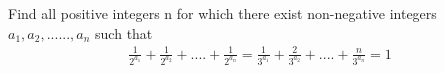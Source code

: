 \item Find all positive integers n for which there exist non-negative integers $a_1, a_2,......,a_n$ such that
\begin{align*}
\frac{1}{2^{a_1}} + \frac{1}{2^{a_2}}+....+\frac{1}{2^{a_n}}
= \frac{1}{3^{a_1}} + \frac{2}{3^{a_2}}+....+\frac{n}{3^{a_n}} = 1
\end{align*}




